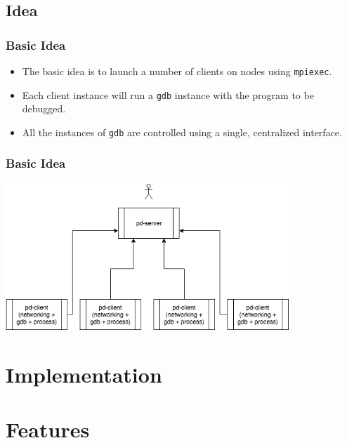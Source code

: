\documentclass{beamer}
\begin{document}
\subsection{Idea}
\begin{frame}
  \frametitle{Basic Idea}
\begin{itemize}
  \item <1-> The basic idea is to launch a number of clients on nodes using \texttt{mpiexec}.
  \item <2-> Each client instance will run a \texttt{gdb} instance with the program to be debugged.
  \item <3-> All the instances of \texttt{gdb} are controlled using a single, centralized interface.
\end{itemize}
\end{frame}

\begin{frame}
  \frametitle{Basic Idea}
   \includegraphics[width=0.8\textwidth]{flow}
\end{frame}
\section{Implementation}

\section{Features}
\end{document}
